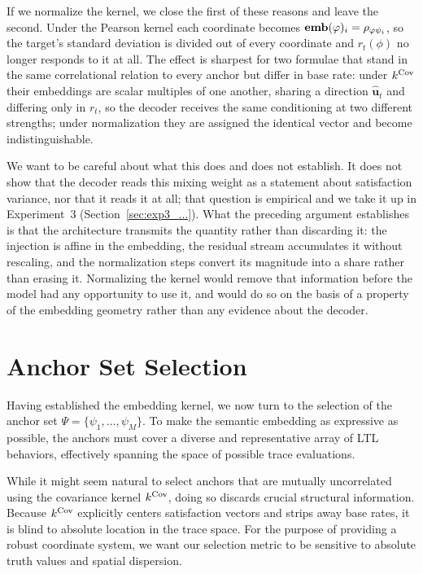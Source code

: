 \documentclass[titlepage,a4paper,11pt]{report}
\begin{document}
    If we normalize the kernel, we close the first of these reasons and leave the second. Under the Pearson kernel each coordinate becomes $\textbf{emb}(\varphi)_i = \rho_{\varphi\psi_i}$, so the target's standard deviation is divided out of every coordinate and $r_t(\phi)$ no longer responds to it at all. The effect is sharpest for two formulae that stand in the same correlational relation to every anchor but differ in base rate: under $k^{\mathrm{Cov}}$ their embeddings are scalar multiples of one another, sharing a direction $\widehat{\bm u}_t$ and differing only in $r_t$, so the decoder receives the same conditioning at two different strengths; under normalization they are assigned the identical vector and become indistinguishable. 

    We want to be careful about what this does and does not establish. It does not show that the decoder reads this mixing weight as a statement about satisfaction variance, nor that it reads it at all; that question is empirical and we take it up in Experiment~3 (Section~\ref{sec:exp3_...}). What the preceding argument establishes is that the architecture transmits the quantity rather than discarding it: the injection is affine in the embedding, the residual stream accumulates it without rescaling, and the normalization steps convert its magnitude into a share rather than erasing it. Normalizing the kernel would remove that information before the model had any opportunity to use it, and would do so on the basis of a property of the embedding geometry rather than any evidence about the decoder.


    
    
    \section{Anchor Set Selection}\label{sec:anchor_selection}
    Having established the embedding kernel, we now turn to the selection of the anchor set $\Psi = \{\psi_1, \dots, \psi_M\}$. To make the semantic embedding as expressive as possible, the anchors must cover a diverse and representative array of LTL behaviors, effectively spanning the space of possible trace evaluations.
    
    While it might seem natural to select anchors that are mutually uncorrelated using the covariance kernel $k^{\mathrm{Cov}}$, doing so discards crucial structural information. Because $k^{\mathrm{Cov}}$ explicitly centers satisfaction vectors and strips away base rates, it is blind to absolute location in the trace space. For the purpose of providing a robust coordinate system, we want our selection metric to be sensitive to absolute truth values and spatial dispersion.
    
\end{document}
